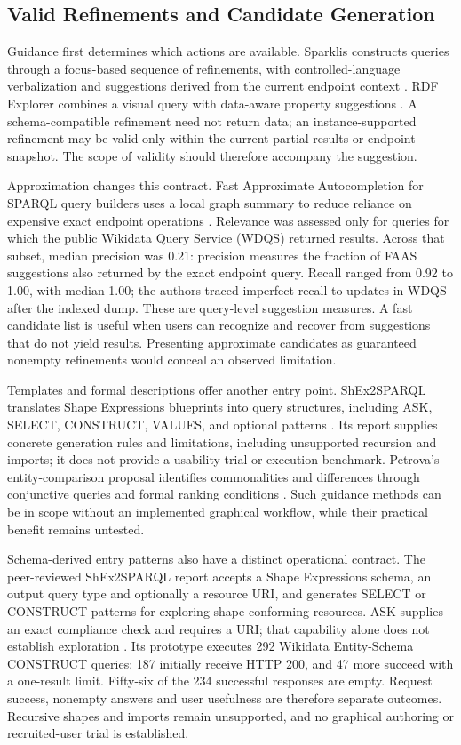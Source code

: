 \documentclass[manuscript,review,screen]{acmart}
\begin{document}
\subsection{Valid Refinements and Candidate Generation}
Guidance first determines which actions are available. Sparklis constructs queries through a focus-based sequence of refinements, with controlled-language verbalization and suggestions derived from the current endpoint context \citep{2017_Ferre_Sparklis_An}. RDF Explorer combines a visual query with data-aware property suggestions \citep{2019_Vargas_RDF_Explorer}. A schema-compatible refinement need not return data; an instance-supported refinement may be valid only within the current partial results or endpoint snapshot. The scope of validity should therefore accompany the suggestion.

Approximation changes this contract. Fast Approximate Autocompletion for SPARQL query builders uses a local graph summary to reduce reliance on expensive exact endpoint operations \citep{2021_Parra_Fast_Approximate}. Relevance was assessed only for queries for which the public Wikidata Query Service (WDQS) returned results. Across that subset, median precision was 0.21: precision measures the fraction of FAAS suggestions also returned by the exact endpoint query. Recall ranged from 0.92 to 1.00, with median 1.00; the authors traced imperfect recall to updates in WDQS after the indexed dump. These are query-level suggestion measures. A fast candidate list is useful when users can recognize and recover from suggestions that do not yield results. Presenting approximate candidates as guaranteed nonempty refinements would conceal an observed limitation.

Templates and formal descriptions offer another entry point. ShEx2SPARQL translates Shape Expressions blueprints into query structures, including ASK, SELECT, CONSTRUCT, VALUES, and optional patterns \citep{V3-01110}. Its report supplies concrete generation rules and limitations, including unsupported recursion and imports; it does not provide a usability trial or execution benchmark. Petrova's entity-comparison proposal identifies commonalities and differences through conjunctive queries and formal ranking conditions \citep{V3-00633}. Such guidance methods can be in scope without an implemented graphical workflow, while their practical benefit remains untested.

Schema-derived entry patterns also have a distinct operational contract. The peer-reviewed ShEx2SPARQL report accepts a Shape Expressions schema, an output query type and optionally a resource URI, and generates SELECT or CONSTRUCT patterns for exploring shape-conforming resources. ASK supplies an exact compliance check and requires a URI; that capability alone does not establish exploration \citep{V3-02495}. Its prototype executes 292 Wikidata Entity-Schema CONSTRUCT queries: 187 initially receive HTTP 200, and 47 more succeed with a one-result limit. Fifty-six of the 234 successful responses are empty. Request success, nonempty answers and user usefulness are therefore separate outcomes. Recursive shapes and imports remain unsupported, and no graphical authoring or recruited-user trial is established.
\end{document}
